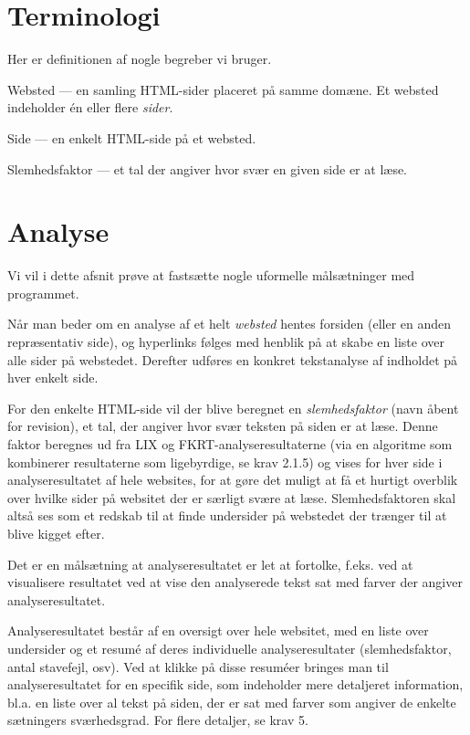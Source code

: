 \documentclass[a4paper,oneside,article]{memoir}
\begin{document}
\section{Terminologi}
Her er definitionen af nogle begreber vi bruger.
\begin{description}
\item Websted --- en samling HTML-sider placeret på samme domæne. Et
  websted indeholder én eller flere \textit{sider}.
\item Side --- en enkelt HTML-side på et websted.
\item Slemhedsfaktor --- et tal der angiver hvor svær en given side er
  at læse.
\end{description}

\section{Analyse}
Vi vil i dette afsnit prøve at fastsætte nogle uformelle målsætninger
med programmet.

Når man beder om en analyse af et helt \textit{websted} hentes
forsiden (eller en anden repræsentativ side), og hyperlinks følges med
henblik på at skabe en liste over alle sider på webstedet. Derefter
udføres en konkret tekstanalyse af indholdet på hver enkelt side.

For den enkelte HTML-side vil der blive beregnet en
\textit{slemhedsfaktor} (navn åbent for revision), et tal, der angiver
hvor svær teksten på siden er at læse. Denne faktor beregnes ud fra
LIX og FKRT-analyseresultaterne (via en algoritme som kombinerer
resultaterne som ligebyrdige, se krav 2.1.5) og vises for hver side i
analyseresultatet af hele websites, for at gøre det muligt at få et
hurtigt overblik over hvilke sider på websitet der er særligt svære at
læse. Slemhedsfaktoren skal altså ses som et redskab til at finde
undersider på webstedet der trænger til at blive kigget efter.

Det er en målsætning at analyseresultatet er let at fortolke,
f.eks. ved at visualisere resultatet ved at vise den analyserede tekst
sat med farver der angiver analyseresultatet.

Analyseresultatet består af en oversigt over hele websitet, med en
liste over undersider og et resumé af deres individuelle
analyseresultater (slemhedsfaktor, antal stavefejl, osv). Ved at
klikke på disse resuméer bringes man til analyseresultatet for en
specifik side, som indeholder mere detaljeret information, bl.a. en
liste over al tekst på siden, der er sat med farver som angiver de
enkelte sætningers sværhedsgrad. For flere detaljer, se krav 5.
\end{document}
